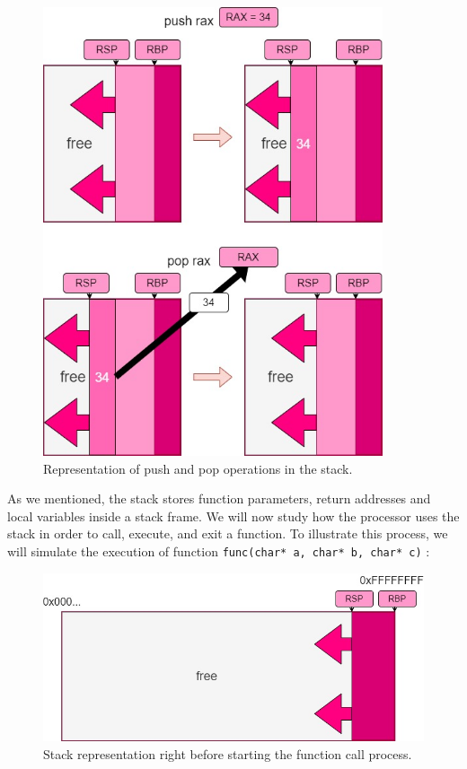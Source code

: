 \documentclass[12pt]{report} %
\begin{document}
\begin{figure}[H]
	\centering
	\includegraphics[width=10cm]{stack_ops.jpg}
	\caption{Representation of push and pop operations in the stack.}
	\label{fig:stack_ops}
\end{figure}



As we mentioned, the stack stores function parameters, return addresses and local variables inside a stack frame. We will now study how the processor uses the stack in order to call, execute, and exit a function. To illustrate this process, we will simulate the execution of function \lstinline{func(char* a, char* b, char* c)} \lstinline{}:

\begin{figure}[H]
	\centering
	\includegraphics[width=14cm]{stack_before.jpg}
	\caption{Stack representation right before starting the function call process.}
	\label{fig:stack_before}
\end{figure}
\end{document}
